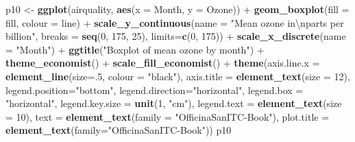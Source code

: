 \documentclass[]{article}
\newenvironment{Shaded}{\begin{snugshade}}{\end{snugshade}}
\newcommand{\KeywordTok}[1]{\textcolor[rgb]{0.13,0.29,0.53}{\textbf{{#1}}}}
\newcommand{\DataTypeTok}[1]{\textcolor[rgb]{0.13,0.29,0.53}{{#1}}}
\newcommand{\DecValTok}[1]{\textcolor[rgb]{0.00,0.00,0.81}{{#1}}}
\newcommand{\CharTok}[1]{\textcolor[rgb]{0.31,0.60,0.02}{{#1}}}
\newcommand{\StringTok}[1]{\textcolor[rgb]{0.31,0.60,0.02}{{#1}}}
\newcommand{\NormalTok}[1]{{#1}}
\begin{document}
\begin{Shaded}
\begin{Highlighting}[]
\NormalTok{p10 <-}\StringTok{ }\KeywordTok{ggplot}\NormalTok{(airquality, }\KeywordTok{aes}\NormalTok{(}\DataTypeTok{x =} \NormalTok{Month, }\DataTypeTok{y =} \NormalTok{Ozone)) +}\StringTok{ }
\StringTok{  }\KeywordTok{geom_boxplot}\NormalTok{(}\DataTypeTok{fill =} \NormalTok{fill, }\DataTypeTok{colour =} \NormalTok{line) +}
\StringTok{  }\KeywordTok{scale_y_continuous}\NormalTok{(}\DataTypeTok{name =} \StringTok{"Mean ozone in}\CharTok{\textbackslash{}n}\StringTok{parts per billion"}\NormalTok{,}
    \DataTypeTok{breaks =} \KeywordTok{seq}\NormalTok{(}\DecValTok{0}\NormalTok{, }\DecValTok{175}\NormalTok{, }\DecValTok{25}\NormalTok{), }\DataTypeTok{limits=}\KeywordTok{c}\NormalTok{(}\DecValTok{0}\NormalTok{, }\DecValTok{175}\NormalTok{)) +}
\StringTok{  }\KeywordTok{scale_x_discrete}\NormalTok{(}\DataTypeTok{name =} \StringTok{"Month"}\NormalTok{) +}
\StringTok{  }\KeywordTok{ggtitle}\NormalTok{(}\StringTok{"Boxplot of mean ozone by month"}\NormalTok{) +}
\StringTok{  }\KeywordTok{theme_economist}\NormalTok{() +}\StringTok{ }\KeywordTok{scale_fill_economist}\NormalTok{() +}
\StringTok{  }\KeywordTok{theme}\NormalTok{(}\DataTypeTok{axis.line.x =} \KeywordTok{element_line}\NormalTok{(}\DataTypeTok{size=}\NormalTok{.}\DecValTok{5}\NormalTok{, }\DataTypeTok{colour =} \StringTok{"black"}\NormalTok{),}
    \DataTypeTok{axis.title =} \KeywordTok{element_text}\NormalTok{(}\DataTypeTok{size =} \DecValTok{12}\NormalTok{),}
    \DataTypeTok{legend.position=}\StringTok{"bottom"}\NormalTok{, }
    \DataTypeTok{legend.direction=}\StringTok{"horizontal"}\NormalTok{,}
    \DataTypeTok{legend.box =} \StringTok{"horizontal"}\NormalTok{, }
    \DataTypeTok{legend.key.size =} \KeywordTok{unit}\NormalTok{(}\DecValTok{1}\NormalTok{, }\StringTok{"cm"}\NormalTok{),}
    \DataTypeTok{legend.text =} \KeywordTok{element_text}\NormalTok{(}\DataTypeTok{size =} \DecValTok{10}\NormalTok{),}
    \DataTypeTok{text =} \KeywordTok{element_text}\NormalTok{(}\DataTypeTok{family =} \StringTok{"OfficinaSanITC-Book"}\NormalTok{),}
    \DataTypeTok{plot.title =} \KeywordTok{element_text}\NormalTok{(}\DataTypeTok{family=}\StringTok{"OfficinaSanITC-Book"}\NormalTok{))}
\NormalTok{p10}
\end{Highlighting}
\end{Shaded}
\end{document}
